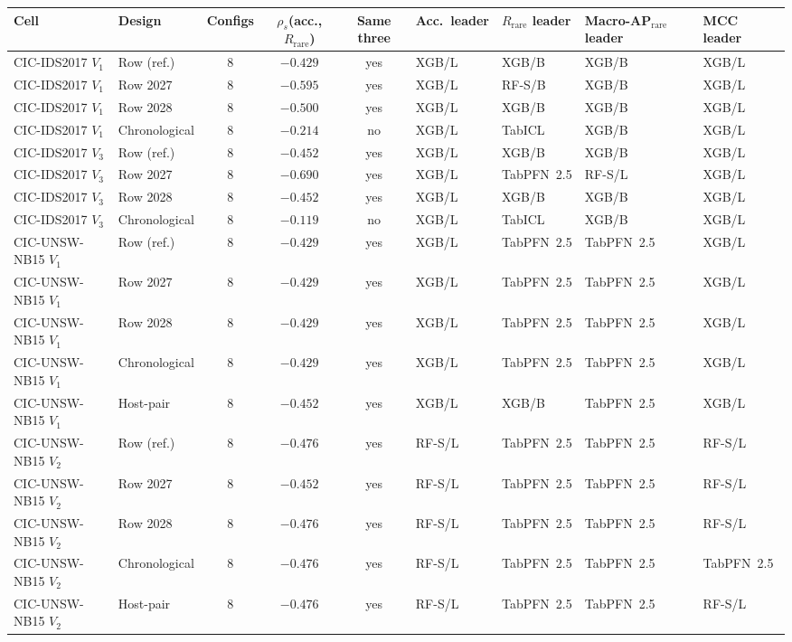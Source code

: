 \begin{tabular}{@{}llcccllll@{}}
\toprule
Cell & Design & Configs & $\rho_s$(acc., $R_{\mathrm{rare}}$) & Same three & Acc.\ leader & $R_{\mathrm{rare}}$ leader & Macro-AP$_{\mathrm{rare}}$ leader & MCC leader \\
\midrule
CIC-IDS2017 $V_1$ & Row (ref.) & 8 & $-0.429$ & yes & XGB/L & XGB/B & XGB/B & XGB/L \\
CIC-IDS2017 $V_1$ & Row 2027 & 8 & $-0.595$ & yes & XGB/L & RF-S/B & XGB/B & XGB/L \\
CIC-IDS2017 $V_1$ & Row 2028 & 8 & $-0.500$ & yes & XGB/L & XGB/B & XGB/B & XGB/L \\
CIC-IDS2017 $V_1$ & Chronological & 8 & $-0.214$ & no & XGB/L & TabICL & XGB/B & XGB/L \\
CIC-IDS2017 $V_3$ & Row (ref.) & 8 & $-0.452$ & yes & XGB/L & XGB/B & XGB/B & XGB/L \\
CIC-IDS2017 $V_3$ & Row 2027 & 8 & $-0.690$ & yes & XGB/L & TabPFN~2.5 & RF-S/L & XGB/L \\
CIC-IDS2017 $V_3$ & Row 2028 & 8 & $-0.452$ & yes & XGB/L & XGB/B & XGB/B & XGB/L \\
CIC-IDS2017 $V_3$ & Chronological & 8 & $-0.119$ & no & XGB/L & TabICL & XGB/B & XGB/L \\
CIC-UNSW-NB15 $V_1$ & Row (ref.) & 8 & $-0.429$ & yes & XGB/L & TabPFN~2.5 & TabPFN~2.5 & XGB/L \\
CIC-UNSW-NB15 $V_1$ & Row 2027 & 8 & $-0.429$ & yes & XGB/L & TabPFN~2.5 & TabPFN~2.5 & XGB/L \\
CIC-UNSW-NB15 $V_1$ & Row 2028 & 8 & $-0.429$ & yes & XGB/L & TabPFN~2.5 & TabPFN~2.5 & XGB/L \\
CIC-UNSW-NB15 $V_1$ & Chronological & 8 & $-0.429$ & yes & XGB/L & TabPFN~2.5 & TabPFN~2.5 & XGB/L \\
CIC-UNSW-NB15 $V_1$ & Host-pair & 8 & $-0.452$ & yes & XGB/L & XGB/B & TabPFN~2.5 & XGB/L \\
CIC-UNSW-NB15 $V_2$ & Row (ref.) & 8 & $-0.476$ & yes & RF-S/L & TabPFN~2.5 & TabPFN~2.5 & RF-S/L \\
CIC-UNSW-NB15 $V_2$ & Row 2027 & 8 & $-0.452$ & yes & RF-S/L & TabPFN~2.5 & TabPFN~2.5 & RF-S/L \\
CIC-UNSW-NB15 $V_2$ & Row 2028 & 8 & $-0.476$ & yes & RF-S/L & TabPFN~2.5 & TabPFN~2.5 & RF-S/L \\
CIC-UNSW-NB15 $V_2$ & Chronological & 8 & $-0.476$ & yes & RF-S/L & TabPFN~2.5 & TabPFN~2.5 & TabPFN~2.5 \\
CIC-UNSW-NB15 $V_2$ & Host-pair & 8 & $-0.476$ & yes & RF-S/L & TabPFN~2.5 & TabPFN~2.5 & RF-S/L \\
\bottomrule
\end{tabular}
